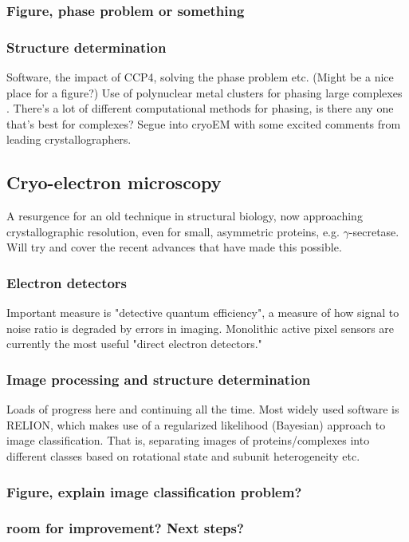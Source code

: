 \documentclass[a4paper,11pt,twoside,openright]{scrbook}
\let\cite\supercite
\begin{document}
\subsubsection{Figure, phase problem or something}

\subsubsection{Structure determination}
Software, the impact of CCP4, solving the phase problem etc. (Might be a nice place for a figure?) Use of polynuclear metal clusters for phasing large complexes \cite{Dauter2005}. There's a lot of different computational methods for phasing, is there any one that's best for complexes? Segue into cryoEM with some excited comments from leading crystallographers.

\subsection{Cryo-electron microscopy}
A resurgence for an old technique in structural biology, now approaching crystallographic resolution, even for small, asymmetric proteins, e.g. \(\gamma\)-secretase. Will try and cover the recent advances that have made this possible.
\subsubsection{Electron detectors}
Important measure is "detective quantum efficiency", a measure of how signal to noise ratio is degraded by errors in imaging. Monolithic active pixel sensors are currently the most useful "direct electron detectors."
\subsubsection{Image processing and structure determination}
Loads of progress here and continuing all the time. Most widely used software is RELION, which makes use of a regularized likelihood (Bayesian) approach to image classification. That is, separating images of proteins/complexes into different classes based on rotational state and subunit heterogeneity etc.
\subsubsection{Figure, explain image classification problem?}
\subsubsection{room for improvement? Next steps?}
\end{document}
